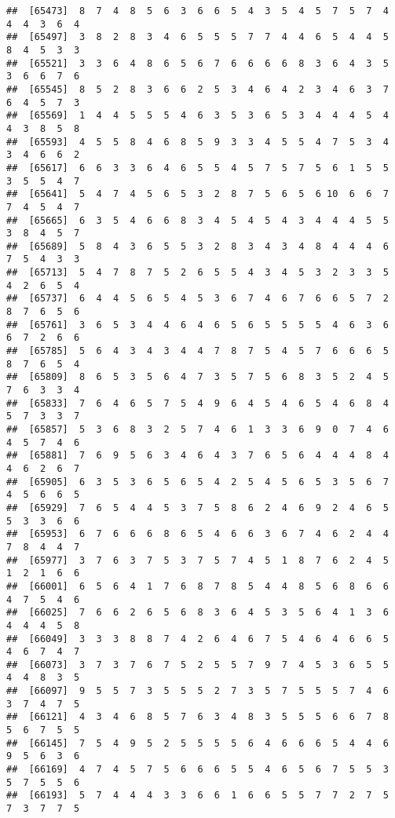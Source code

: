 \documentclass[
]{book}
\begin{document}
\begin{verbatim}
##  [65473]  8  7  4  8  5  6  3  6  6  5  4  3  5  4  5  7  5  7  4  4  4  3  6  4
##  [65497]  3  8  2  8  3  4  6  5  5  5  7  7  4  4  6  5  4  4  5  8  4  5  3  3
##  [65521]  3  3  6  4  8  6  5  6  7  6  6  6  6  8  3  6  4  3  5  3  6  6  7  6
##  [65545]  8  5  2  8  3  6  6  2  5  3  4  6  4  2  3  4  6  3  7  6  4  5  7  3
##  [65569]  1  4  4  5  5  5  4  6  3  5  3  6  5  3  4  4  4  5  4  4  3  8  5  8
##  [65593]  4  5  5  8  4  6  8  5  9  3  3  4  5  5  4  7  5  3  4  3  4  6  6  2
##  [65617]  6  6  3  3  6  4  6  5  5  4  5  7  5  7  5  6  1  5  5  3  5  5  4  7
##  [65641]  5  4  7  4  5  6  5  3  2  8  7  5  6  5  6 10  6  6  7  7  4  5  4  7
##  [65665]  6  3  5  4  6  6  8  3  4  5  4  5  4  3  4  4  4  5  5  3  8  4  5  7
##  [65689]  5  8  4  3  6  5  5  3  2  8  3  4  3  4  8  4  4  4  6  7  5  4  3  3
##  [65713]  5  4  7  8  7  5  2  6  5  5  4  3  4  5  3  2  3  3  5  4  2  6  5  4
##  [65737]  6  4  4  5  6  5  4  5  3  6  7  4  6  7  6  6  5  7  2  8  7  6  5  6
##  [65761]  3  6  5  3  4  4  6  4  6  5  6  5  5  5  5  4  6  3  6  6  7  2  6  6
##  [65785]  5  6  4  3  4  3  4  4  7  8  7  5  4  5  7  6  6  6  5  8  7  6  5  4
##  [65809]  8  6  5  3  5  6  4  7  3  5  7  5  6  8  3  5  2  4  5  7  6  3  3  4
##  [65833]  7  6  4  6  5  7  5  4  9  6  4  5  4  6  5  4  6  8  4  5  7  3  3  7
##  [65857]  5  3  6  8  3  2  5  7  4  6  1  3  3  6  9  0  7  4  6  4  5  7  4  6
##  [65881]  7  6  9  5  6  3  4  6  4  3  7  6  5  6  4  4  4  8  4  4  6  2  6  7
##  [65905]  6  3  5  3  6  5  6  5  4  2  5  4  5  6  5  3  5  6  7  4  5  6  6  5
##  [65929]  7  6  5  4  4  5  3  7  5  8  6  2  4  6  9  2  4  6  5  5  3  3  6  6
##  [65953]  6  7  6  6  6  8  6  5  4  6  6  3  6  7  4  6  2  4  4  7  8  4  4  7
##  [65977]  3  7  6  3  7  5  3  7  5  7  4  5  1  8  7  6  2  4  5  1  2  1  6  6
##  [66001]  6  5  6  4  1  7  6  8  7  8  5  4  4  8  5  6  8  6  6  4  7  5  4  6
##  [66025]  7  6  6  2  6  5  6  8  3  6  4  5  3  5  6  4  1  3  6  4  4  4  5  8
##  [66049]  3  3  3  8  8  7  4  2  6  4  6  7  5  4  6  4  6  6  5  4  6  7  4  7
##  [66073]  3  7  3  7  6  7  5  2  5  5  7  9  7  4  5  3  6  5  5  4  4  8  3  5
##  [66097]  9  5  5  7  3  5  5  5  2  7  3  5  7  5  5  5  7  4  6  3  7  4  7  5
##  [66121]  4  3  4  6  8  5  7  6  3  4  8  3  5  5  5  6  6  7  8  5  6  7  5  5
##  [66145]  7  5  4  9  5  2  5  5  5  5  6  4  6  6  6  5  4  4  6  9  5  6  3  6
##  [66169]  4  7  4  5  7  5  6  6  6  5  5  4  6  5  6  7  5  5  3  5  7  5  5  6
##  [66193]  5  7  4  4  4  3  3  6  6  1  6  6  5  5  7  7  2  7  5  7  3  7  7  5

\end{verbatim}
\end{document}
